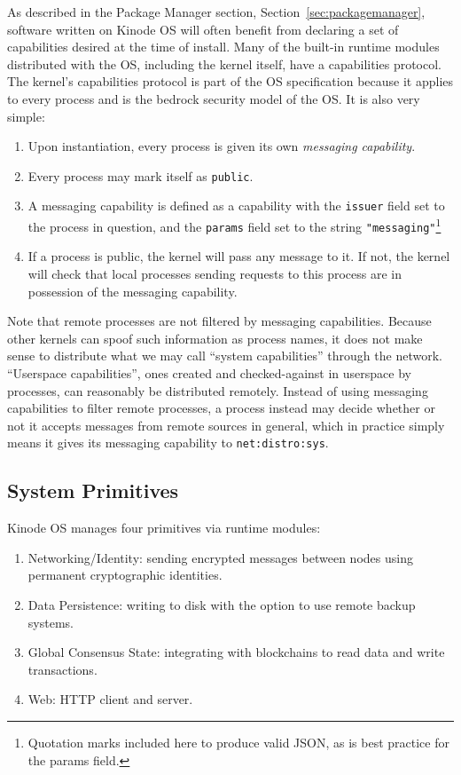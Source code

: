\documentclass[runningheads]{llncs}
\begin{document}
As described in the Package Manager section, Section~\ref{sec:packagemanager}, software written on Kinode OS will often benefit from declaring a set of capabilities desired at the time of install.
Many of the built-in runtime modules distributed with the OS, including the kernel itself, have a capabilities protocol.
The kernel's capabilities protocol is part of the OS specification because it applies to every process and is the bedrock security model of the OS.
It is also very simple:
\begin{enumerate}
    \item Upon instantiation, every process is given its own \textit{messaging capability}.
    \item Every process may mark itself as \verb|public|.
    \item A messaging capability is defined as a capability with the \verb|issuer| field set to the process in question, and the \verb|params| field set to the string \verb|"messaging"|\footnote{Quotation marks included here to produce valid JSON, as is best practice for the params field.}
    \item If a process is public, the kernel will pass any message to it. If not, the kernel will check that local processes sending requests to this process are in possession of the messaging capability.
\end{enumerate}

Note that remote processes are not filtered by messaging capabilities.
Because other kernels can spoof such information as process names, it does not make sense to distribute what we may call ``system capabilities'' through the network.
``Userspace capabilities'', ones created and checked-against in userspace by processes, can reasonably be distributed remotely.
Instead of using messaging capabilities to filter remote processes, a process instead may decide whether or not it accepts messages from remote sources in general, which in practice simply means it gives its messaging capability to \verb|net:distro:sys|.

\subsection{System Primitives}
\label{sec:osprimitives}

Kinode OS manages four primitives via runtime modules:

\begin{enumerate}
    \item Networking/Identity: sending encrypted messages between nodes using permanent cryptographic identities.
    \item Data Persistence: writing to disk with the option to use remote backup systems.
    \item Global Consensus State: integrating with blockchains to read data and write transactions.
    \item Web: HTTP client and server.
\end{enumerate}
\end{document}
